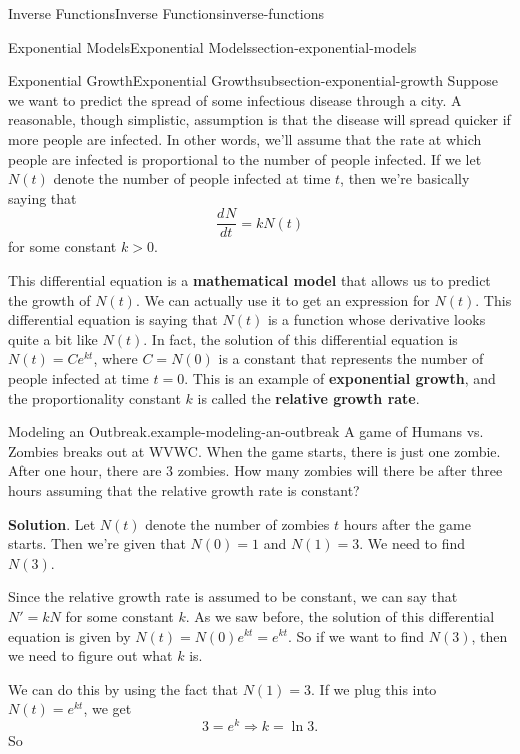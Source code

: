 \documentclass[oneside,10pt,]{book}
\newcommand{\terminology}[1]{\textbf{#1}}
\numberwithin{equation}{section}
\newcommand{\dv}[3][]{\dfrac{d^{#1} #2}{d #3^{#1}}}
\begin{document}
\begin{chapterptx}{Inverse Functions}{}{Inverse Functions}{}{}{inverse-functions}
\begin{sectionptx}{Exponential Models}{}{Exponential Models}{}{}{section-exponential-models}
\begin{subsectionptx}{Exponential Growth}{}{Exponential Growth}{}{}{subsection-exponential-growth}
Suppose we want to predict the spread of some infectious disease through a city. A reasonable, though simplistic, assumption is that the disease will spread quicker if more people are infected. In other words, we'll assume that the rate at which people are infected is proportional to the number of people infected. If we let \(N(t)\) denote the number of people infected at time \(t\), then we're basically saying that%
\begin{equation*}
\dv{N}{t} = kN(t)
\end{equation*}
for some constant \(k > 0\).%
\par
\hypertarget{p-247}{}%
This differential equation is a \terminology{mathematical model} that allows us to predict the growth of \(N(t)\). We can actually use it to get an expression for \(N(t)\). This differential equation is saying that \(N(t)\) is a function whose derivative looks quite a bit like \(N(t)\). In fact, the solution of this differential equation is \(N(t) = Ce^{kt}\), where \(C = N(0)\) is a constant that represents the number of people infected at time \(t=0\). This is an example of \terminology{exponential growth}, and the proportionality constant \(k\) is called the \terminology{relative growth rate}.%
\begin{example}{Modeling an Outbreak.}{example-modeling-an-outbreak}%
\hypertarget{p-248}{}%
A game of Humans vs. Zombies breaks out at WVWC. When the game starts, there is just one zombie. After one hour, there are \(3\) zombies. How many zombies will there be after three hours assuming that the relative growth rate is constant?%
\par\smallskip%
\noindent\textbf{Solution}.\hypertarget{solution-54}{}\quad%
\hypertarget{p-249}{}%
Let \(N(t)\) denote the number of zombies \(t\) hours after the game starts. Then we're given that \(N(0) = 1\) and \(N(1) = 3\). We need to find \(N(3)\).%
\par
\hypertarget{p-250}{}%
Since the relative growth rate is assumed to be constant, we can say that \(N' = kN\) for some constant \(k\). As we saw before, the solution of this differential equation is given by \(N(t) = N(0)e^{kt} = e^{kt}\). So if we want to find \(N(3)\), then we need to figure out what \(k\) is.%
\par
\hypertarget{p-251}{}%
We can do this by using the fact that \(N(1) = 3\). If we plug this into \(N(t) = e^{kt}\), we get%
\begin{equation*}
3 = e^{k} \Rightarrow k = \ln3.
\end{equation*}
So%

\end{example}
\end{subsectionptx}
\end{sectionptx}
\end{chapterptx}
\end{document}
